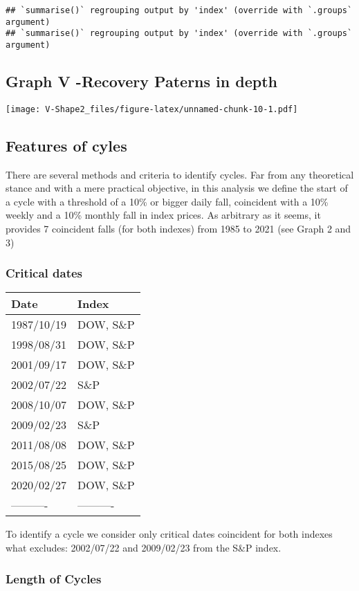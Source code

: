 \documentclass[
]{article}
\begin{document}
\begin{verbatim}
## `summarise()` regrouping output by 'index' (override with `.groups` argument)
## `summarise()` regrouping output by 'index' (override with `.groups` argument)
\end{verbatim}

\hypertarget{graph-v--recovery-paterns-in-depth}{%
\subsection{Graph V -Recovery Paterns in
depth}\label{graph-v--recovery-paterns-in-depth}}

\texttt{[image: V-Shape2\_files/figure-latex/unnamed-chunk-10-1.pdf]}

\hypertarget{features-of-cyles}{%
\subsection{Features of cyles}\label{features-of-cyles}}

There are several methods and criteria to identify cycles. Far from any
theoretical stance and with a mere practical objective, in this analysis
we define the start of a cycle with a threshold of a 10\% or bigger
daily fall, coincident with a 10\% weekly and a 10\% monthly fall in
index prices. As arbitrary as it seems, it provides 7 coincident falls
(for both indexes) from 1985 to 2021 (see Graph 2 and 3)

\hypertarget{critical-dates}{%
\subsubsection{Critical dates}\label{critical-dates}}

\begin{longtable}[]{@{}ll@{}}
\toprule
Date & Index\tabularnewline
\midrule
\endhead
1987/10/19 & DOW, S\&P\tabularnewline
1998/08/31 & DOW, S\&P\tabularnewline
2001/09/17 & DOW, S\&P\tabularnewline
2002/07/22 & S\&P\tabularnewline
2008/10/07 & DOW, S\&P\tabularnewline
2009/02/23 & S\&P\tabularnewline
2011/08/08 & DOW, S\&P\tabularnewline
2015/08/25 & DOW, S\&P\tabularnewline
2020/02/27 & DOW, S\&P\tabularnewline
---------- & ----------\tabularnewline
\bottomrule
\end{longtable}

To identify a cycle we consider only critical dates coincident for both
indexes what excludes: 2002/07/22 and 2009/02/23 from the S\&P index.

\hypertarget{length-of-cycles}{%
\subsubsection{Length of Cycles}\label{length-of-cycles}}
\end{document}
